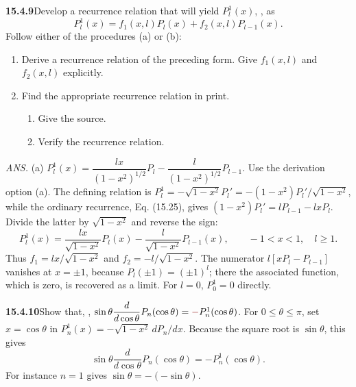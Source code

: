 \par\bigskip
\noindent\textbf{15.4.9}\quad Develop a recurrence relation that will
yield $P_{l}^{1}(x)$, , as
\[
P_{l}^{1}(x)=f_{1}(x,l)P_{l}(x)+f_{2}(x,l)P_{l-1}(x).
\]
Follow either of the procedures (a) or (b):
\begin{enumerate}
\item[(a)] Derive a recurrence relation of the preceding form. Give
$f_{1}(x,l)$ and $f_{2}(x,l)$ explicitly.
\item[(b)] Find the appropriate recurrence relation in print.
\begin{enumerate}
\item[(1)] Give the source.
\item[(2)] Verify the recurrence relation.
\end{enumerate}
\end{enumerate}
\par\nobreak\hfill\emph{ANS.}\enspace
(a) $P_{l}^{1}(x)=\dfrac{lx}{(1-x^{2})^{1/2}}P_{l}
-\dfrac{l}{(1-x^{2})^{1/2}}P_{l-1}$.
\solution
Use the derivation option (a). The defining relation is
$P_l^1=-\sqrt{1-x^2}P_l'=-(1-x^2)P_l'/\sqrt{1-x^2}$, while the
ordinary recurrence, Eq. (15.25), gives
$(1-x^2)P_l'=lP_{l-1}-lxP_l$.
Divide the latter by $\sqrt{1-x^2}$ and reverse the sign:
\[
\boxed{P_l^1(x)=\frac{lx}{\sqrt{1-x^2}}P_l(x)
-\frac{l}{\sqrt{1-x^2}}P_{l-1}(x)},\qquad -1<x<1,\quad l\ge1.
\]
Thus $f_1=lx/\sqrt{1-x^2}$ and $f_2=-l/\sqrt{1-x^2}$.
The numerator $l[xP_l-P_{l-1}]$ vanishes at $x=\pm1$, because
$P_l(\pm1)=(\pm1)^l$; there the associated function, which is zero,
is recovered as a limit. For $l=0$, $P_0^1=0$ directly.

\par\bigskip
\noindent\textbf{15.4.10}\quad Show that, ,
$\sin\theta\dfrac{d}{d\cos\theta}P_{n}(\cos\theta)
=\erratum{-}P_{n}^{1}(\cos\theta)$.
\solution
For $0\le\theta\le\pi$, set $x=\cos\theta$ in
$P_n^1(x)=-\sqrt{1-x^2}\,dP_n/dx$.
Because the square root is $\sin\theta$, this gives
\[
\boxed{\sin\theta\frac{d}{d\cos\theta}P_n(\cos\theta)
=-P_n^1(\cos\theta)}.
\]
For instance $n=1$ gives $\sin\theta=-(-\sin\theta)$.

